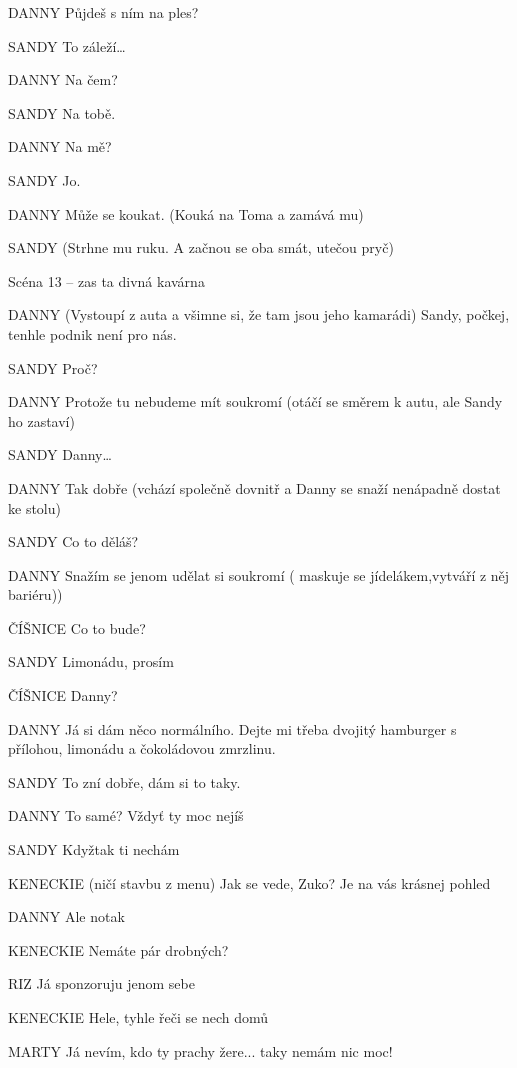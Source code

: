 DANNY        Půjdeš s ním na ples? 

SANDY        To záleží…

DANNY        Na čem? 

SANDY        Na tobě. 

DANNY        Na mě? 

SANDY        Jo. 

DANNY        Může se koukat. (Kouká na Toma a zamává mu)

SANDY        (Strhne mu ruku. A začnou se oba smát, utečou pryč) 

Scéna 13 – zas ta divná kavárna 

DANNY         (Vystoupí z auta a všimne si, že tam jsou jeho kamarádi) Sandy, počkej,           tenhle podnik není pro nás. 

SANDY         Proč? 

DANNY        Protože tu nebudeme mít soukromí (otáčí se směrem k autu, ale Sandy         ho zastaví) 

SANDY        Danny… 

DANNY         Tak dobře (vchází společně dovnitř a Danny se snaží nenápadně dostat         ke stolu) 

SANDY         Co to děláš? 

DANNY         Snažím se jenom udělat si soukromí ( maskuje se jídelákem,vytváří z něj bariéru))

ČÍŠNICE         Co to bude? 

SANDY        Limonádu, prosím 

ČÍŠNICE         Danny? 

DANNY        Já si dám něco normálního. Dejte mi třeba dvojitý hamburger s přílohou,         limonádu a čokoládovou zmrzlinu. 

SANDY        To zní dobře, dám si to taky. 

DANNY         To samé? Vždyť ty moc nejíš 

SANDY         Kdyžtak ti nechám 

KENECKIE        (ničí stavbu z menu) Jak se vede, Zuko? Je na vás krásnej pohled 

DANNY         Ale notak

KENECKIE        Nemáte pár drobných?

RIZ                Já sponzoruju jenom sebe 

KENECKIE        Hele, tyhle řeči se nech domů 

MARTY        Já nevím, kdo ty prachy žere... taky nemám nic moc! 

